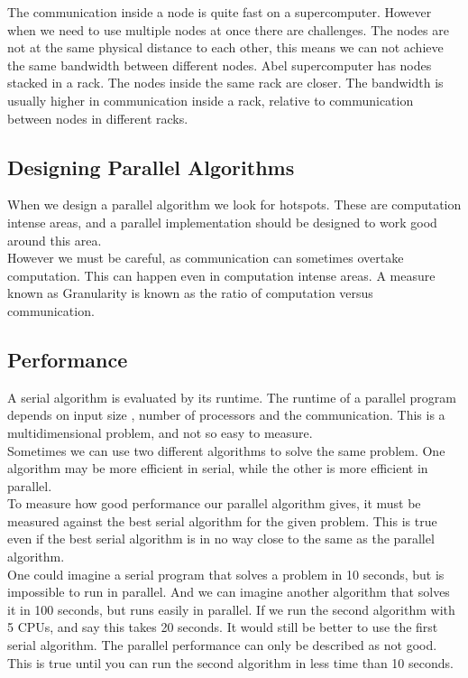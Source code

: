 \documentclass[a4paper,norsk,11pt,twoside]{report}
\begin{document}
The communication inside a node is quite fast on a supercomputer. However when we need to use multiple nodes at once there are challenges. The nodes are not at the same physical distance to each other, this means we can not achieve the same bandwidth between different nodes. Abel supercomputer has nodes stacked in a rack. The nodes inside the same rack are closer. The bandwidth is usually higher in communication inside a rack, relative to communication between nodes in different racks. 

\subsection{Designing Parallel Algorithms}
When we design a parallel algorithm we look for hotspots. These are computation intense areas, and a parallel implementation should be designed to work good around this area. \\

However we must be careful, as communication can sometimes overtake computation. This can happen even in computation intense areas. A measure known as Granularity is known as the ratio of computation versus communication.

\subsection{Performance}
A serial algorithm is evaluated by its runtime. The runtime of a parallel program depends on input size , number of processors and the communication. This is a multidimensional problem, and not so easy to measure. \\

Sometimes we can use two different algorithms to solve the same problem. One algorithm may be more efficient in serial, while the other is more efficient in parallel. \\

To measure how good performance our parallel algorithm gives, it must be measured against the best serial algorithm for the given problem. This is true even if the best serial algorithm is in no way close to the same as the parallel algorithm. \\

One could imagine a serial program that solves a problem in 10 seconds, but is impossible to run in parallel. And we can imagine another algorithm that solves it in 100 seconds, but runs easily in parallel. If we run the second algorithm with 5 CPUs, and say this takes 20 seconds. It would still be better to use the first serial algorithm. The parallel performance can only be described as not good. This is true until you can run the second algorithm in less time than 10 seconds. \\
\end{document}
